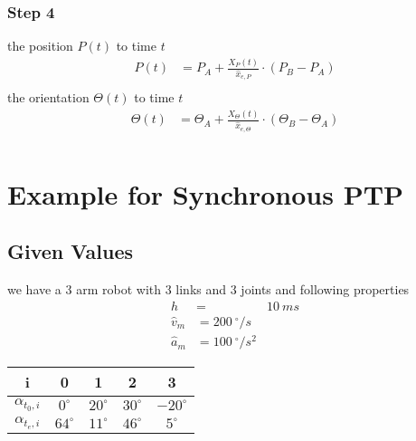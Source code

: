 \documentclass[%
  professionalfonts,%
  xcolor={%
    usenames,%
    dvipsnames,%
    svgnames,%
    table,%
    hyperref%
  }%
]{beamer}
\begin{document}
\subsubsection{Step 4}
\begin{frame}
the position $P(t)$ to time $t$
\begin{align*}
P(t) & = P_{A} + \frac{X_{P}(t)}{\hat{x}_{e,P}} \cdot \left(P_{B} - P_{A} \right)\\
\end{align*}
the orientation $\Theta(t)$ to time $t$
\begin{align*}
\Theta(t) & = \Theta_{A} + \frac{X_{\Theta}(t)}{\hat{x}_{e,\Theta}} \cdot \left(\Theta_{B} - \Theta_{A} \right)\\
\end{align*}
\end{frame}

\section{Example for Synchronous PTP} 

\subsection{Given Values }
\begin{frame}
we have a 3 arm robot with 3 links and 3 joints and following properties\\

\begin{align*}
h & = & 10 ~ms \\
\hat{v}_{m} & = 200 ~^\circ/s \\
\hat{a}_{m} & = 100 ~^\circ/s^2
\end{align*}

\begin{center}
\begin{tabular}{ccccc}
\toprule
i & 0 & 1 & 2 & 3 \\
\midrule
$\alpha_{t_{0},i}$ & $  0^\circ$ & $20^\circ$ & $30^\circ$ & $-20^\circ$ \\ 
$\alpha_{t_{e},i}$ & $ 64^\circ$ & $11^\circ$ & $46^\circ$ & $  5^\circ$ \\
\bottomrule
\end{tabular}
\end{center}
\end{frame}
\end{document}
